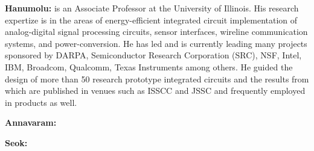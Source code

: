 \noindent
\textbf{Hanumolu:} is an Associate Professor at the University of Illinois. 
His research expertize is in the areas of energy-efficient integrated circuit implementation of analog-digital signal processing circuits, sensor interfaces, wireline communication systems, and power-conversion. 
He has led and is currently leading many projects sponsored by DARPA, Semiconductor Research Corporation (SRC), NSF, Intel, IBM, Broadcom, Qualcomm, Texas Instruments among others. 
He guided the design of more than 50 research prototype integrated circuits and the results from which are published in venues such as ISSCC and JSSC and frequently employed in products as well.   

\noindent
\textbf{Annavaram:}

\noindent
\textbf{Seok:}

